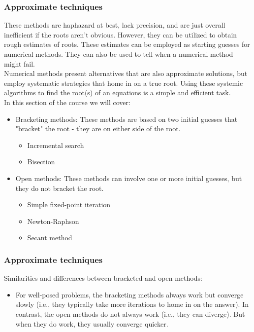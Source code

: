 \documentclass{if-beamer}
\begin{document}
\begin{frame}
\frametitle{Approximate techniques}
These methods are haphazard at best, lack precision, and are just overall inefficient if the roots aren't obvious. However, they can be utilized to obtain rough estimates of roots. These estimates can be employed as starting guesses for numerical methods. They can also be used to tell when a numerical method might fail.\\
\vspace{10pt}
Numerical methods present alternatives that are also approximate solutions, but employ systematic strategies that home in on a true root. Using these systemic algorithms to find the root(s) of an equations is a simple and efficient task.\\
\vspace{10pt}
In this section of the course we will cover:
\begin{itemize}
	\item Bracketing methods: These methods are based on two initial guesses that "bracket" the root - they are on either side of the root.  
	\begin{itemize}
		\item Incremental search
		\item Bisection
	\end{itemize}
	\item Open methods: These methods can involve one or more initial guesses, but they do not bracket the root.
	\begin{itemize}
		\item Simple fixed-point iteration
		\item Newton-Raphson
		\item Secant method
	\end{itemize}
\end{itemize}  
\end{frame}

\begin{frame}
\frametitle{Approximate techniques}
Similarities and differences between bracketed and open methods: \\
\vspace{10pt}
\begin{itemize}
	\item For well-posed problems, the bracketing methods always work but converge slowly (i.e., they typically take more iterations to home in on the answer). In contrast, the open methods do not always work (i.e., they can diverge). But when they do work, they usually converge quicker. \\\vspace{10pt}
\end{itemize}

\end{frame}
\end{document}

